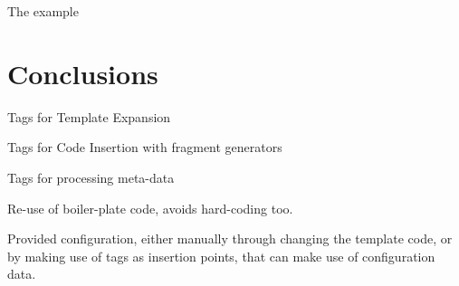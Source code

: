 \documentclass{llncs}%
\begin{document}
The example
%
\section{Conclusions}
Tags for Template Expansion

Tags for Code Insertion with fragment generators

Tags for processing meta-data

Re-use of boiler-plate code, avoids hard-coding too.

Provided configuration, either manually through changing the template code, or by making use of tags as insertion points, that can make use of configuration data.
%


%
%
%
\end{document}
